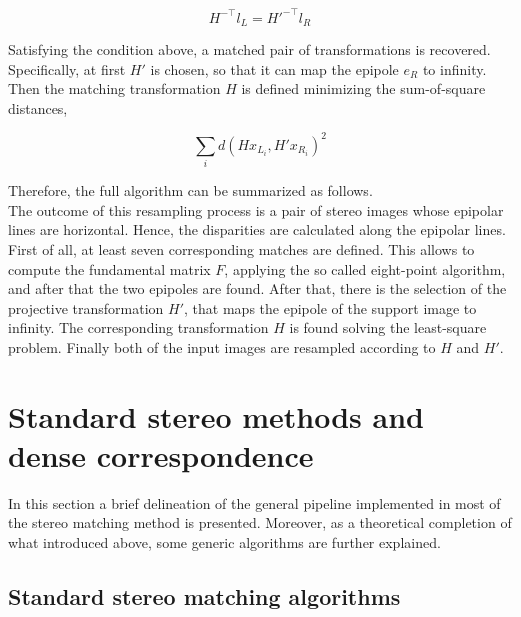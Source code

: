 \begin{equation}
	H^{-\top} l_L = H'^{-\top} l_R
\end{equation}

Satisfying the condition above, a matched pair of transformations is recovered.\\
Specifically, at first $H'$ is chosen, so that it can map the epipole $e_R$ to infinity. 
Then the matching transformation $H$ is defined minimizing the sum-of-square distances,

\begin{equation}
\label{eqn:match-transf-constr}
	\sum_i d(H x_{L_i}, H'x_{R_i})^2
\end{equation}

Therefore, the full algorithm can be summarized as follows.\\
The outcome of this resampling process is a pair of stereo images whose epipolar lines are horizontal.
Hence, the disparities are calculated along the epipolar lines. 
First of all, at least seven corresponding matches are defined.
This allows to compute the fundamental matrix $F$, applying the so called eight-point algorithm, and after that the two epipoles are found.
After that, there is the selection of the projective transformation $H'$, that maps the epipole of the support image to infinity.
The corresponding transformation $H$ is found solving the least-square problem.
Finally both of the input images are resampled according to $H$ and $H'$.

\section{Standard stereo methods and dense correspondence}
\label{section:stereo-methods}

In this section a brief delineation of the general pipeline implemented in most of the stereo matching method is presented. 
Moreover, as a theoretical completion of what introduced above, some generic algorithms are further explained.

\subsection{Standard stereo matching algorithms}
\label{subsection:standard-methods}

